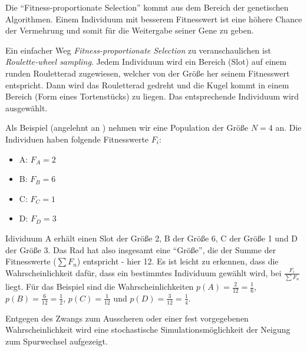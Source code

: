 Die \enquote{Fitness-proportionate Selection} kommt aus dem Bereich der genetischen Algorithmen. 
Einem Individuum mit besserem Fitnesswert ist eine höhere Chance der Vermehrung und somit für die Weitergabe seiner Gene zu geben. 

Ein einfacher Weg \textit{Fitness-proportionate Selection} zu veranschaulichen ist \textit{Roulette-wheel sampling}. 
Jedem Individuum wird ein Bereich (Slot) auf einem runden Rouletterad zugewiesen, welcher von der Größe her seinem Fitnesswert entspricht. 
Dann wird das Rouletterad gedreht und die Kugel kommt in einem Bereich (Form eines Tortenstücks) zu liegen. 
Das entsprechende Individuum wird ausgewählt.

Als Beispiel (angelehnt an ) nehmen wir eine Population der Größe $N=4$ an. 
Die Individuen haben folgende Fitnesswerte $F_{i}$: 
\begin{itemize}
	\item A: $F_{A}=2$
	\item B: $F_{B}=6$
	\item C: $F_{C}=1$
	\item D: $F_{D}=3$
\end{itemize}

Idividuum A erhält einen Slot der Größe 2, B der Größe 6, C der Größe 1 und D der Größe 3. 
Das Rad hat also insgesamt eine \enquote{Größe}, die der Summe der Fitnesswerte ($\sum F_{n}$) entspricht - hier 12. 
Es ist leicht zu erkennen, dass die Wahrscheinlichkeit dafür, dass ein bestimmtes Individuum gewählt wird, bei $\frac{F_{i}}{\sum F_{n}}$ liegt. 
Für das Beispiel sind die Wahrscheinlichkeiten $p(A)=\frac{2}{12}=\frac{1}{6}$, $p(B)=\frac{6}{12}=\frac{1}{2}$, $p(C)=\frac{1}{12}$ und $p(D)=\frac{3}{12}=\frac{1}{4}$.


Entgegen des Zwangs zum Ausscheren oder einer fest vorgegebenen Wahrscheinlichkeit wird eine stochastische Simulationsmöglichkeit der Neigung zum Spurwechsel aufgezeigt.





